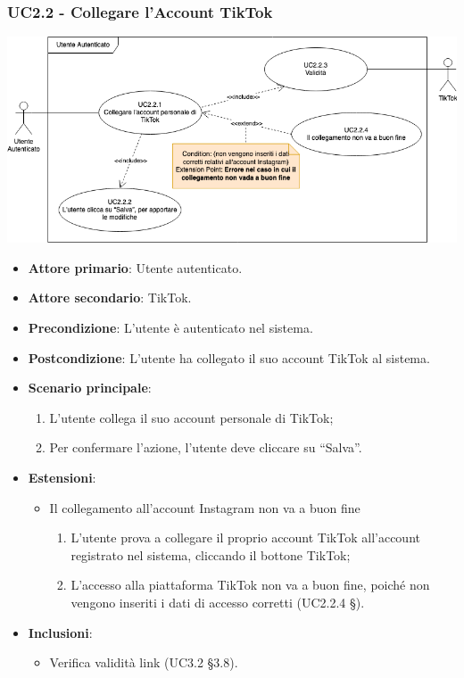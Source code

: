 \subsubsection{UC2.2 - Collegare l'Account TikTok}
\begin{center}
\includegraphics[scale=0.5]{UC_images/UC2_2.png}
\end{center}
\begin{itemize}
\item \textbf{Attore primario}: Utente autenticato.
\item \textbf{Attore secondario}: TikTok.
\item \textbf{Precondizione}: L’utente è autenticato nel sistema.
\item \textbf{Postcondizione}: L’utente ha collegato il suo account TikTok al sistema.

\item \textbf{Scenario principale}:
\begin{enumerate}
\item L’utente collega il suo account personale di TikTok;
\item Per confermare l’azione, l’utente deve cliccare su “Salva”. 
\end{enumerate}

\item \textbf{Estensioni}:
\begin{itemize}
\item Il collegamento all’account Instagram non va a buon fine
\begin{enumerate}
	\item L’utente prova a collegare il proprio account TikTok all’account registrato nel sistema, cliccando il bottone TikTok;
	\item L’accesso alla piattaforma TikTok non va a buon fine, poiché non vengono inseriti i dati di accesso corretti (UC2.2.4 §).
\end{enumerate}
\end{itemize}

\item \textbf{Inclusioni}:
\begin{itemize}
\item Verifica validità link (UC3.2 §3.8).
\end{itemize}
\end{itemize}

